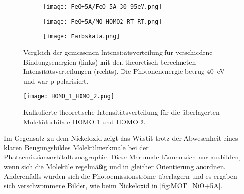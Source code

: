 \begin{figure}
\begin{subfigure}[t]{0.48\textwidth}
                \label{fig:MOT_FeO+5A_theo_3}
            \end{subfigure}
            \centering
            \begin{subfigure}[t]{0.48\textwidth}
                \centering
                \texttt{[image: FeO+5A/FeO\_5A\_30\_95eV.png]}
                \label{fig:MOT_FeO+5A_exp_4}
            \end{subfigure}
            \begin{subfigure}[t]{0.48\textwidth}
                \centering
                \texttt{[image: FeO+5A/MO\_HOMO2\_RT\_RT.png]}
                \label{fig:MOT_FeO+5A_theo_4}
            \end{subfigure}
            \begin{subfigure}[t]{\textwidth}
                \centering
                \texttt{[image: Farbskala.png]}
            \end{subfigure}
            \caption{Vergleich der gemessenen Intensitätsverteilung für verschiedene Bindungsenergien (links) mit den theoretisch berechneten Intensitätsverteilungen (rechts).
            Die Photonenenergie betrug \SI{40}{\electronvolt} und war p polarisiert.}
            \label{fig:MOT_FeO_5A}
        \end{figure}
        \begin{figure}
            \centering
            \texttt{[image: HOMO\_1\_HOMO\_2.png]}
            \caption{Kalkulierte theoretische Intensitätsverteilung für die überlagerten Molekülorbitale HOMO-1 und HOMO-2.} %
            \label{fig:MOT_FeO+5A_theo_5}
        \end{figure}
        Im Gegensatz zu dem Nickeloxid zeigt das Wüstit trotz der Abwesenheit eines klaren Beugungsbildes Molekülmerkmale bei der Photoemissionsorbitaltomographie.
        Diese Merkmale können sich nur ausbilden, wenn sich die Moleküle regelmäßig und in gleicher Orientierung anordnen.
        Anderenfalls würden sich die Photoemissionströme überlagern und es ergäben sich verschwommene Bilder, wie beim Nickeloxid in \autoref{fig:MOT_NiO+5A}.

